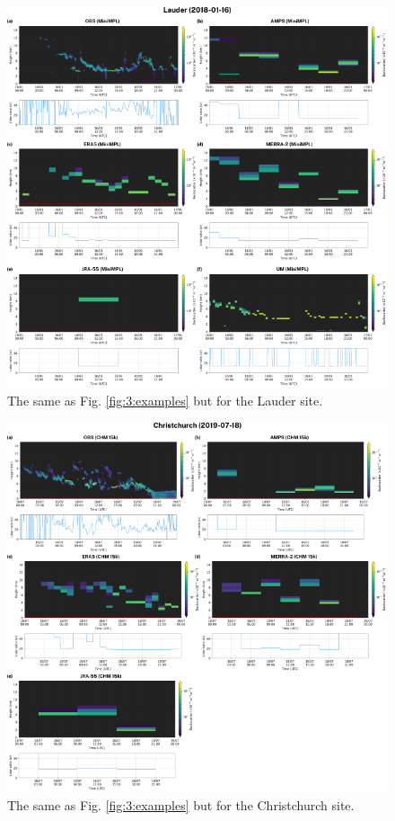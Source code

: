 \begin{figure}[p]
\centering
\includegraphics[width=\textwidth]{chapter3/fig/examples2.pdf}
\caption{
The same as Fig. \ref{fig:3:examples} but for the Lauder site.
}
\label{fig:3:examples2}
\end{figure}

\begin{figure}[p]
\centering
\includegraphics[width=\textwidth]{chapter3/fig/examples3.pdf}
\caption{
The same as Fig. \ref{fig:3:examples} but for the Christchurch site.
}
\label{fig:3:examples3}
\end{figure}

